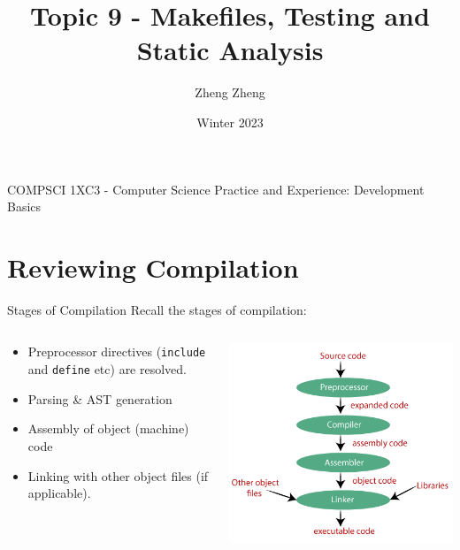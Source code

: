 \documentclass[11pt]{beamer}
\author{Zheng Zheng}
\title{Topic 9 - Makefiles, Testing and Static Analysis}
\institute{McMaster University}
\date{Winter 2023}
\begin{document}
\begin{frame}
\center
COMPSCI 1XC3 - Computer Science Practice and Experience:
Development Basics
\titlepage
\end{frame}

\begin{frame}
\tableofcontents
\end{frame}

\section[Compilation]{Reviewing Compilation}
\begin{frame}{Stages of Compilation}
Recall the stages of compilation: \\
\begin{columns}
\begin{column}{0.4\textwidth}
\begin{itemize}
\item Preprocessor directives (\texttt{include} and \texttt{define} etc) are resolved.
\item Parsing \& AST generation
\item Assembly of object (machine) code 
\item Linking with other object files (if applicable).
\end{itemize}
\end{column}
\begin{column}{0.6\textwidth}
\includegraphics[scale=0.40]{stages.png}
\end{column}
\end{columns}
\end{frame}
\end{document}
